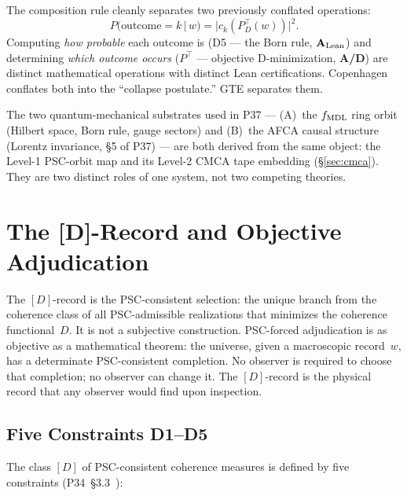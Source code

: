 \documentclass[11pt,openany]{book}
\theoremstyle{remark}
\newcommand{\CatAL}{\ensuremath{\textbf{A}_{\rm Lean}}}
\newcommand{\CatAD}{\textbf{A/D}}
\begin{document}
The composition rule cleanly separates two previously conflated operations:
\[
  P(\text{outcome} = k \,|\, w) = |c_k(P^\top_D(w))|^2.
\]
Computing \emph{how probable} each outcome is (D5 --- the Born rule, \CatAL) and
determining \emph{which outcome occurs} ($P^\top$ --- objective D-minimization,
\CatAD) are distinct mathematical operations with distinct Lean certifications.
Copenhagen conflates both into the ``collapse postulate.''  GTE separates them.

The two quantum-mechanical substrates used in P37 --- (A)~the $f_{\rm MDL}$ ring
orbit (Hilbert space, Born rule, gauge sectors) and (B)~the AFCA causal structure
(Lorentz invariance, §5 of P37) --- are both derived from the same object: the Level-1
PSC-orbit map and its Level-2 CMCA tape embedding (§\ref{sec:cmca}). They are
two distinct roles of one system, not two competing theories.

\section{The [D]-Record and Objective Adjudication}
\label{sec:d_record}

The $[D]$-record is the PSC-consistent selection: the unique branch from the coherence
class of all PSC-admissible realizations that minimizes the coherence functional~$D$.
It is not a subjective construction.  PSC-forced adjudication is as objective as a
mathematical theorem: the universe, given a macroscopic record~$w$, has a determinate
PSC-consistent completion.  No observer is required to choose that completion; no
observer can change it.  The $[D]$-record is the physical record that any observer would
find upon inspection.

\subsection*{Five Constraints D1--D5}

The class $[D]$ of PSC-consistent coherence measures is defined by five constraints
(P34~§3.3~\cite{SpivackGTEMobius}):
\end{document}
